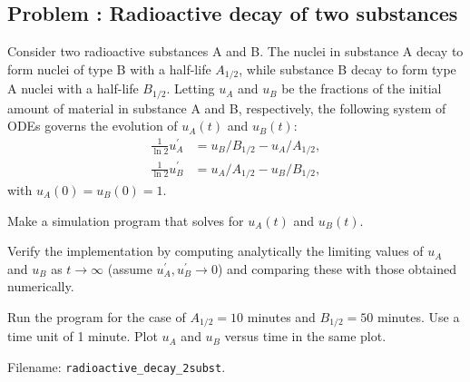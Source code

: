\documentclass[graybox,sectrefs,envcountresetchap,open=right,final]{svmonodo}
\newenvironment{doconceexercise}{}{}
\newcounter{doconceexercisecounter}
\begin{document}
\begin{doconceexercise}

\subsection*{Problem \thedoconceexercisecounter: Radioactive decay of two substances}

\label{decay:app:exer:radio:twosubst}

Consider two radioactive substances A and B. The nuclei in substance A
decay to form nuclei of type B with a half-life $A_{1/2}$, while
substance B decay to form type A nuclei with a half-life $B_{1/2}$.
Letting $u_A$ and $u_B$ be the fractions of the initial amount of
material in substance A and B, respectively, the following system of
ODEs governs the evolution of $u_A(t)$ and $u_B(t)$:
\begin{align}
\frac{1}{\ln 2} u_A^{\prime} &= u_B/B_{1/2} - u_A/A_{1/2},\\ 
\frac{1}{\ln 2} u_B^{\prime} &= u_A/A_{1/2} - u_B/B_{1/2},
\end{align}
with $u_A(0)=u_B(0)=1$.


Make a simulation program that solves for $u_A(t)$ and $u_B(t)$.

Verify the implementation by computing analytically
the limiting values of
$u_A$ and $u_B$ as $t\rightarrow \infty$ (assume $u_A^{\prime},u_B^{\prime}\rightarrow 0$)
and comparing these with those obtained numerically.

Run the program for the case of $A_{1/2}=10$ minutes and $B_{1/2}=50$ minutes.
Use a time unit of 1 minute. Plot $u_A$ and $u_B$ versus time in the same
plot.

\noindent Filename: \Verb!radioactive_decay_2subst!.

\end{doconceexercise}
\end{document}
